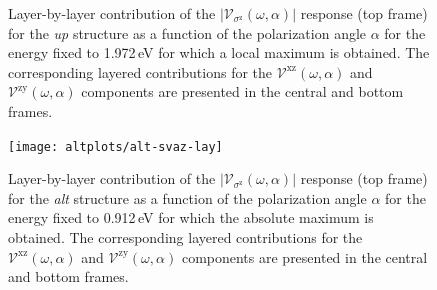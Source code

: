 \documentclass[prb,11pt,tightenlines,twocolumn,aps]{revtex4-1}
\begin{document}
\begin{figure}[t]
    \caption{Layer-by-layer contribution of the
    $|\mathcal{V}_{\sigma^{\mathrm{z}}}(\omega,\alpha)|$ response (top frame)
    for the \emph{up} structure as a function of the polarization angle
    $\alpha$ for the energy fixed to 1.972\,eV for which a local maximum is
    obtained.
    The corresponding layered contributions for the
    $\mathcal{V}^{\mathrm{xz}}(\omega,\alpha)$ and
    $\mathcal{V}^{\mathrm{zy}}(\omega,\alpha)$ components are presented in the
    central and bottom frames.}
    \label{fig:up-vsz-lay-2}
\end{figure}

\begin{figure}[t]
    \centering
    \texttt{[image: altplots/alt-svaz-lay]}
    
\caption{Layer-by-layer contribution of the
    $|\mathcal{V}_{\sigma^{\mathrm{z}}}(\omega,\alpha)|$ response (top frame)
    for the \emph{alt} structure as a function of the polarization angle
    $\alpha$ for the energy fixed to 0.912\,eV for which the absolute maximum
    is obtained.
    The corresponding layered contributions for the
    $\mathcal{V}^{\mathrm{xz}}(\omega,\alpha)$ and
    $\mathcal{V}^{\mathrm{zy}}(\omega,\alpha)$ components are presented in the
    central and bottom frames.}
    \label{fig:alt-vsz-lay}
\end{figure}
% 
\end{document}
